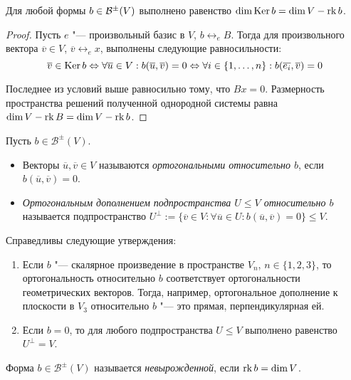 \begin{theorem}
	Для любой формы $b \in \mathcal B^\pm(V)$ выполнено равенство $\dim{\operatorname{Ker}{b}} = \dim{V} - \operatorname{rk}{b}$.
\end{theorem}

\begin{proof}
	Пусть $e$ "--- произвольный базис в $V$, $b \leftrightarrow_e B$. Тогда для произвольного вектора $\overline{v} \in V$, $\overline{v} \leftrightarrow_e x$, выполнены следующие равносильности:
	\[\overline{v} \in \ke{b} \Leftrightarrow \forall \overline{u} \in V: b(\overline{u}, \overline{v}) \hm{=} 0 \Leftrightarrow \forall i \in \{1, \dotsc, n\}: b(\overline{e_i}, \overline{v}) = 0\]
	
	Последнее из условий выше равносильно тому, что $Bx = 0$. Размерность пространства решений полученной однородной системы равна $\dim{V} - \operatorname{rk}{B} = \dim{V} - \operatorname{rk}{b}$.
\end{proof}

\begin{definition}
	Пусть $b \in \mathcal{B}^\pm(V)$.
	\begin{itemize}
		\item Векторы $\overline{u}, \overline{v} \in V$ называются \textit{ортогональными относительно $b$}, если $b(\overline{u}, \overline{v}) = 0$.
  
		\item \textit{Ортогональным дополнением подпространства $U \le V$ относительно $b$} называется подпространство $U^\perp := \{\overline{v} \in V: \forall \overline{u} \in U: b(\overline{u}, \overline{v}) = 0\} \le V$.
	\end{itemize}
\end{definition}

\begin{example}
	Справедливы следующие утверждения:
	\begin{enumerate}
		\item Если $b$ "--- скалярное произведение в пространстве $V_n$, $n \in \{1, 2, 3\}$, то ортогональность относительно $b$ соответствует ортогональности геометрических векторов. Тогда, например, ортогональное дополнение к плоскости в $V_3$ относительно $b$ "--- это прямая, перпендикулярная ей.
		\item Если $b = 0$, то для любого подпространства $U \le V$ выполнено равенство $U^\perp = V$.
	\end{enumerate}
\end{example}

\begin{definition}
	Форма $b \in \mathcal{B}^\pm(V)$ называется \textit{невырожденной}, если $\operatorname{rk}{b} = \dim{V}$.
\end{definition}

